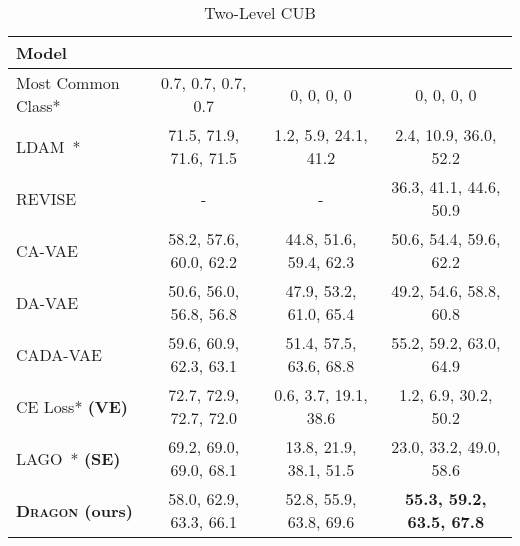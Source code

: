 \documentclass[10pt,twocolumn,letterpaper]{article}
\newcommand{\DRAGON}{\textsc{Dragon}}
\begin{document}
\begin{table*}
\begin{subtable}{\textwidth}
\centering
   \begin{tabular}{l|c|c|c}
   Model & 
    \textbf{} & \textbf{} &
    \textbf{} \\
  \midrule
    Most Common Class* &
    0.7, 0.7, 0.7, 0.7 & 0, 0, 0, 0 & 0, 0, 0, 0  \\
    \hline
    LDAM~\cite{cao2019learning}* &
    71.5, 71.9, 71.6, 71.5 & 1.2, 5.9, 24.1, 41.2 & 2.4, 10.9, 36.0, 52.2   \\
    \hline
    REVISE~\cite{REVISE} &
    - & - & 36.3, 41.1, 44.6, 50.9  \\
    CA-VAE~\cite{Schnfeld2019GeneralizedZL}&
    58.2, 57.6, 60.0, 62.2 & 44.8, 51.6, 59.4, 62.3 & 50.6, 54.4, 59.6, 62.2   \\
    DA-VAE~\cite{Schnfeld2019GeneralizedZL} &
    50.6, 56.0, 56.8, 56.8 & 47.9, 53.2, 61.0, 65.4 & 49.2, 54.6, 58.8, 60.8   \\
    CADA-VAE~\cite{Schnfeld2019GeneralizedZL} &
    59.6, 60.9, 62.3, 63.1 & 51.4, 57.5, 63.6, 68.8 & 55.2, 59.2, 63.0, 64.9  \\
    \hline
    CE Loss* \textbf{(VE)} &
    72.7, 72.9, 72.7, 72.0 & 0.6, 3.7, 19.1, 38.6 & 1.2, 6.9, 30.2, 50.2   \\
    LAGO~\cite{LAGO}* \textbf{(SE)} &
    69.2, 69.0, 69.0, 68.1 & 13.8, 21.9, 38.1, 51.5 & 23.0, 33.2, 49.0, 58.6   \\
    \textbf{\DRAGON{} (ours)} &
    58.0, 62.9, 63.3, 66.1 & 52.8, 55.9, 63.8, 69.6 & \textbf{55.3, 59.2, 63.5, 67.8}   \\
\bottomrule
\end{tabular}
\caption{Two-Level CUB}
   \label{tab:sub_first}
\end{subtable}


\end{table*}
\end{document}
